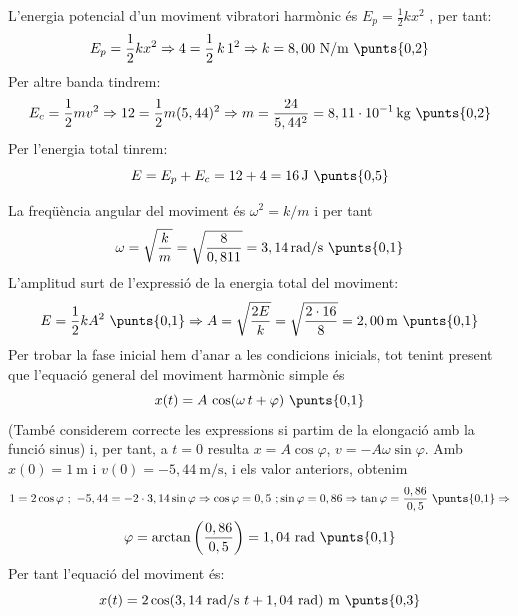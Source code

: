 \begin{solapartat}
L'energia potencial d'un moviment vibratori harmònic és $E_p = \frac{1}{2}kx^2$ , per tant:
\[ E_p = \frac{1}{2}kx^2 \Rightarrow 4 = \frac{1}{2}\,k\,1^2 \Rightarrow k = 8,00\ \mathrm{N/m}\ \text{\punts{0,2}} \]
Per altre banda tindrem:
\[ E_c = \frac{1}{2}mv^2 \Rightarrow 12 = \frac{1}{2}m(5,44)^2 \Rightarrow m = \frac{24}{5,44^2} = 8,11\cdot 10^{-1}\,\mathrm{kg}\ \text{\punts{0,2}} \]
Per l'energia total tinrem:
\[ E = E_p + E_c = 12 + 4 = 16\,\mathrm{J}\ \text{\punts{0,5}} \]
\end{solapartat}

\begin{solapartat}
La freqüència angular del moviment és $\omega^2 = k/m$  i per tant
\[ \omega = \sqrt{\frac{k}{m}} = \sqrt{\frac{8}{0,811}} = 3,14\,\mathrm{rad/s}\ \text{\punts{0,1}} \]
L'amplitud surt de l'expressió de la energia total del moviment:
\[ E = \frac{1}{2}kA^2\ \text{\punts{0,1}} \Rightarrow A = \sqrt{\frac{2E}{k}} = \sqrt{\frac{2\cdot 16}{8}} = 2,00\,\mathrm{m}\ \text{\punts{0,1}} \]
Per trobar la fase inicial hem d'anar a les condicions inicials, tot tenint present que l'equació general del moviment harmònic simple és
\[ x(t) = A\,\cos(\omega\,t + \varphi)\ \text{\punts{0,1}} \]
(També considerem correcte les expressions si partim de la elongació amb la funció sinus) i, per tant, a $t = 0$ resulta $x = A\cos\varphi$, $v = -A\omega\sin\varphi$. Amb $x(0) = 1\ \mathrm{m}$ i $v(0) = -5,44\ \mathrm{m/s}$, i els valor anteriors, obtenim
\[ 1 = 2\cos\varphi\ ;\ -5,44 = -2\cdot 3,14\sin\varphi \Rightarrow \cos\varphi = 0,5\ ;\sin\varphi = 0,86 \Rightarrow \tan\varphi = \frac{0,86}{0,5}\ \text{\punts{0,1}} \Rightarrow \]
\[ \varphi = \arctan\left(\frac{0,86}{0,5}\right) = 1,04\ \mathrm{rad}\ \text{\punts{0,1}} \]
Per tant l'equació del moviment és:
\[ x(t) = 2\cos(3,14\ \mathrm{rad/s}\ t + 1,04\ \mathrm{rad})\ \mathrm{m}\ \text{\punts{0,3}} \]
\end{solapartat}
